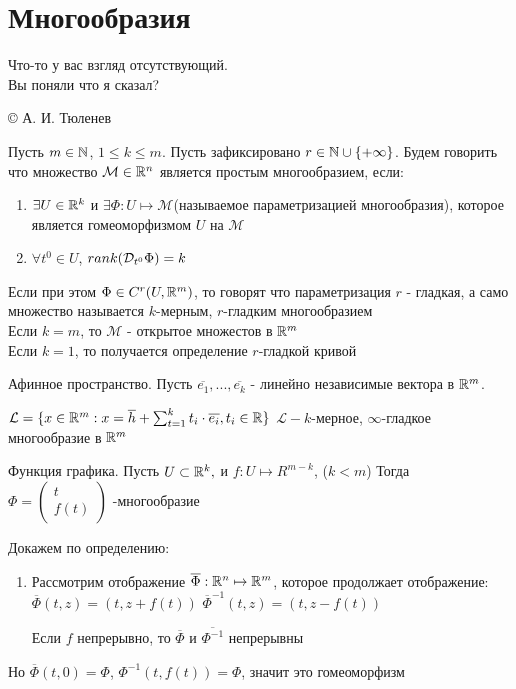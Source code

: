 \newcommand{\M}{\mathcal{M}}
\newcommand{\G}{\mathcal{G}}


\newpage


\section{Многообразия}
\setlength{\epigraphwidth}{0.5\textwidth}
\epigraph{\normalsize{Что-то у вас взгляд отсутствующий. \\Вы поняли что я сказал?}}{\large{© А. И. Тюленев}}
\begin{definition}
    Пусть $m \in \mathbb{N}$, $1 \leq k \leq m$. Пусть зафиксировано $r \in \mathbb{N} \cup \{+\infty \}$. Будем говорить что множество $\M \in \R^{n}$ является простым многообразием, если:
    \begin{enumerate}
        \item $\exists U \in \mathbb{R}^k$ и $\exists \Phi: U \mapsto \M$(называемое параметризацией многообразия), которое является гомеоморфизмом $U$ на $\M$
        \item $\forall t^0 \in U$, $rank(\mathcal{D}_{t^0}\Phi) = k$
    \end{enumerate}
    Если при этом $\Phi \in C^{r}(U, \mathbb{R}^m)$, то говорят что параметризация $r$ - гладкая, а само множество называется $k$-мерным, $r$-гладким многообразием\\
    Если $k = m$, то $\M$ - открытое множестов в $\mathbb{R}^{m}$\\
    Если $k=1$, то получается определение $r$-гладкой кривой
\end{definition}

\begin{example}
    Афинное пространство.
    Пусть $\overline{e_1},...,\overline{e_k}$ - линейно независимые вектора в $\mathbb{R}^m$.

    $\mathcal{L} = \{ x\in \mathbb{R}^m: x = \overline{h} + \sum_{t=1}^{k} t_i \cdot \overline{e_i}, t_i \in \mathbb{R} \}$
    $\mathcal{L} - k$-мерное, $\infty$-гладкое многообразие в $\mathbb{R}^m$
\end{example}

\begin{example}
Функция графика. Пусть $U\subset \mathbb{R}^k,$ и $f: U \mapsto R^{m-k}$, ($k<m$)
    Тогда $\Phi = \begin{pmatrix}
  t\\
  f(t)
\end{pmatrix}$ -многообразие

Докажем по определению:
\begin{enumerate}
    \item Рассмотрим отображение $\overline{\Phi}: \mathbb{R}^n \mapsto \mathbb{R}^m$, которое продолжает отображение:
    $\overline{\Phi}(t, z) = (t, z + f(t))$
    $\overline{\Phi}^{-1}(t, z) = (t, z - f(t))$

    Если $f$ непрерывно, то $\overline{\Phi}$ и $\overline{\Phi^{-1}}$ непрерывны
\end{enumerate}
Но $\overline{\Phi}(t, 0) = \Phi$, $\Phi^{-1}(t, f(t)) = \Phi$, значит это гомеоморфизм
\end{example}

